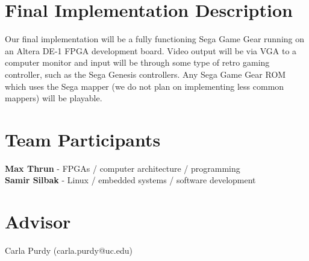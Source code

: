 \documentclass[12pt]{article}
\begin{document}
\section*{Final Implementation Description}
Our final implementation will be a fully functioning Sega Game Gear running on an Altera DE-1 FPGA
development board. Video output will be via VGA to a computer monitor and input will be through some type of retro
gaming controller, such as the Sega Genesis controllers. Any Sega Game Gear ROM which uses the Sega mapper 
(we do not plan on implementing less common mappers) will be playable.

\section*{Team Participants}
{\bf Max Thrun} - FPGAs / computer architecture / programming  
\\
{\bf Samir Silbak} - Linux / embedded systems / software development

\section*{Advisor}
Carla Purdy (carla.purdy@uc.edu)
\end{document}
